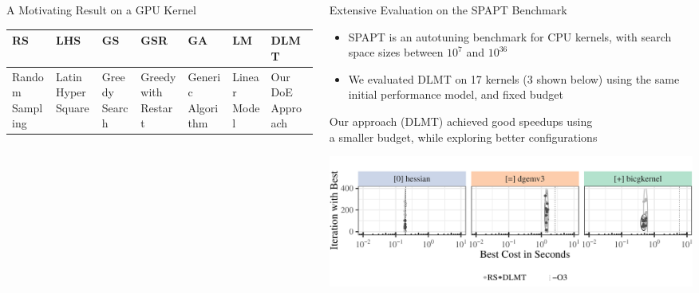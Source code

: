 \documentclass[11pt, compress, aspectratio=169, xcolor={table,usenames,dvipsnames}]{beamer}
\begin{document}
\begin{frame}
\begin{columns}
\begin{column}{0.89\columnwidth}
\begin{columns}
\begin{column}[t]{0.48\columnwidth}
\begin{block}{A Motivating Result on a GPU Kernel}
\begin{table}[htbp]
\centering
\tiny
\begin{tabular}{p{}p{}p{}p{}p{}p{}p{}}
\toprule
RS & LHS & GS & GSR & GA & LM & DLMT\\
\midrule
Random Sampling & Latin Hyper Square & Greedy Search & Greedy with Restart & Generic Algorithm & Linear Model & Our DoE Approach\\
\bottomrule
\end{tabular}
\end{table}
\end{block}
\end{column}
\begin{column}[t]{0.48\columnwidth}
\begin{block}{Extensive Evaluation on the SPAPT Benchmark}
\begin{itemize}
\item \alert{SPAPT} is an \alert{autotuning benchmark} for \alert{CPU kernels}, with \alert{search space sizes}
between \alert{\(10^7\) and \(10^{36}\)}
\item We evaluated \alert{DLMT} on \alert{17 kernels} (\alert{3} shown below)
using \alert{the same initial performance model}, and \alert{fixed budget}
\end{itemize}

\vspace{0.3em}
\begin{center}
{\small
Our approach (\alert{DLMT}) achieved \alert{good speedups} using
      \\[0.3em] a \alert{smaller budget}, while \alert{exploring better
configurations}
}
\end{center}
\begin{center}
\begin{center}
\includegraphics[width=0.85\columnwidth]{../../../img/iteration_best_comparison.pdf}
\end{center}
\end{center}


\end{block}
\end{column}
\end{columns}
\end{column}
\end{columns}
\end{frame}
\end{document}
